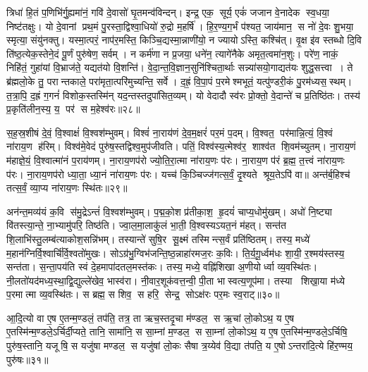 त्रिधा॑ हि॒तं प॒णिभि॑र्गु॒ह्यमा॑नं॒ गवि॑ दे॒वासो॑ घृ॒तमन्व॑विन्दन्। इन्द्र॒ एक॒ सूर्य॒ एकं॑ जजान वे॒नादेक स्व॒धया॒ निष्ट॑तक्षुः। यो दे॒वानां प्रथ॒मं पु॒रस्ता॒द्विश्वा॒धियो॑ रु॒द्रो म॒हर्\mbox{}षि॑। हि॒र॒ण्य॒ग॒र्भं प॑श्यत॒ जाय॑मान॒ स नो॑ दे॒वः शु॒भया॒ स्मृत्या॒ संयु॑नक्तु। यस्मा॒त्परं॒ नाप॑र॒मस्ति॒ किञ्चि॒द्यस्मा॒न्नाणी॑यो॒ न ज्यायोऽस्ति॒ कश्चि॑त्। वृ॒क्ष इ॑व स्तब्धो दि॒वि ति॑ष्ठ॒त्येक॒स्तेने॒दं पू॒र्णं पुरु॑षेण॒ सर्वम्। न कर्म॑णा न प्र॒जया॒ धने॑न॒ त्यागे॑नैके अमृत॒त्वमा॑न॒शुः। परे॑ण॒ नाकं॒ निहि॑तं॒ गुहा॑यां वि॒भ्राज॑ते॒ यद्यत॑यो वि॒शन्ति॑। वे॒दा॒न्त॒वि॒ज्ञान॒सुनि॑श्चिता॒र्थाः सन्न्या॑सयो॒गाद्यत॑यः शुद्ध॒सत्त्वा। ते ब्र॑ह्मलो॒के तु॒ परान्तकाले॒ परा॑मृता॒त्परि॑मुच्यन्ति॒ सर्वे। द॒ह्रं॒ वि॒पा॒पं प॒रमेश्मभूतं॒ यत्पु॑ण्डरी॒कं पु॒रम॑ध्यस॒स्थम्। त॒त्रा॒पि॒ द॒ह्रं ग॒गनं॑ विशोक॒स्तस्मि॑न् यद॒न्तस्तदुपा॑सित॒व्यम्। यो वेदादौ स्व॑रः प्रो॒क्तो॒ वे॒दान्ते॑ च प्र॒तिष्ठि॑तः। तस्य॑ प्र॒कृति॑लीन॒स्य॒ य॒ पर॑ स म॒हेश्व॑रः॥२८॥
\anuvakamend

स॒ह॒स्र॒शी\sr{}षं दे॒वं॒ वि॒श्वाक्षं॑ वि॒श्वश॑म्भुवम्। विश्वं॑ ना॒राय॑णं दे॒व॒म॒क्षरं॑ पर॒मं प॒दम्। 
वि॒श्वत॒ पर॑मान्नि॒त्यं॒ वि॒श्वं ना॑राय॒ण ह॑रिम्। विश्व॑मे॒वेदं पुरु॑ष॒स्तद्विश्व॒मुप॑जीवति। 
पतिं॒ विश्व॑स्य॒\aav{}\aav{}त्मेश्व॑र॒ शाश्व॑त शि॒वम॑च्युतम्। ना॒राय॒णं म॑हाज्ञे॒यं॒ वि॒श्वात्मा॑नं प॒राय॑णम्। ना॒राय॒णप॑रो ज्यो॒ति॒रा॒त्मा ना॑राय॒णः प॑रः। ना॒राय॒ण प॑रं ब्र॒ह्म॒ त॒त्त्वं ना॑राय॒णः प॑रः। ना॒राय॒णप॑रो ध्या॒ता॒ ध्या॒नं ना॑राय॒णः प॑रः। यच्च॑ कि॒ञ्चिज्ज॑गत्स॒र्वं॒ दृ॒श्यते श्रूय॒तेऽपि॑ वा॥ अन्त॑र्ब॒हिश्च॑ तत्स॒र्वं॒ व्या॒प्य ना॑राय॒णः स्थि॑तः॥२९॥

 अन॑न्त॒मव्य॑यं क॒वि स॑मु॒द्रेऽन्तं॑ वि॒श्वश॑म्भुवम्। प॒द्म॒को॒श प्र॑तीका॒श॒ हृ॒दयं॑ चाप्य॒धोमु॑खम्। अधो॑ नि॒ष्ट्या वि॑तस्त्या॒न्ते॒ ना॒भ्यामु॑परि॒ तिष्ठ॑ति। ज्वा॒ल॒मा॒लाकु॑लं भा॒ती॒ वि॒श्वस्यऽ\sav{}यत॒नं म॑हत्। सन्त॑त शि॒लाभि॑स्तु॒\-लम्ब॑त्याकोश॒सन्नि॑भम्। तस्यान्ते॑ सुषि॒र सू॒क्ष्मं तस्मिन्त्स॒र्वं प्रति॑ष्ठितम्। तस्य॒ मध्ये॑ म॒हान॑\-ग्निर्वि॒श्वार्चि॑र्वि॒श्वतो॑मुखः। सोऽग्र॑भु॒ग्विभ॑जन्ति॒ष्ठ॒न्नाहा॑रमज॒रः क॒विः। ति॒र्य॒गू॒र्ध्वम॑धः शा॒यी॒ र॒श्मय॑स्तस्य॒ सन्त॑ता। स॒न्ता॒पय॑ति स्वं दे॒हमापा॑द\-तल॒\-मस्त॑कः। तस्य॒ मध्ये॒ वह्नि॑शिखा अ॒णीयोर्ध्वा व्य॒वस्थि॑तः। नी॒लतो॑यद॑\-मध्य॒स्था॒द्वि॒द्युल्ले॑खेव॒ भास्व॑रा। नी॒वार॒शूक॑वत्त॒न्वी॒ पी॒ता भास्वत्य॒णूप॑मा। तस्या शिखा॒या म॑ध्ये प॒रमात्मा व्य॒वस्थि॑तः। स ब्रह्म॒ स शिव॒ स हरि॒ सेन्द्र॒ सोऽक्ष॑रः पर॒मः स्व॒राट्॥३०॥
\anuvakamend[ना॒रा॒य॒णः स्थि॑तो व्य॒वस्थि॑तश्च॒त्वारि॑ च]

आ॒दि॒त्यो वा ए॒ष ए॒तन्म॒ण्डलं॒ तप॑ति॒ तत्र॒ ता ऋच॒स्तदृ॒चा म॑ण्डल॒ स ऋ॒चां लो॒कोऽथ॒ य ए॒ष ए॒तस्मि॑न्म॒ण्डले॒ऽर्चिर्दी॒प्यते॒ तानि॒ सामा॑नि॒ स सा॒म्नां म॒ण्डल॒ स सा॒म्नां लो॒कोऽथ॒ य ए॒ष ए॒तस्मि॑न्म॒ण्डले॒ऽर्चिषि॒ पुरु॑ष॒स्तानि॒ यजूषि॒ स यजु॑षा मण्डल॒ स यजु॑षां लो॒कः सैषा त्र॒य्येव॑ वि॒द्या त॑पति॒ य ए॒षोऽन्तरा॑दि॒त्ये हि॑र॒ण्मय॒ पुरु॑षः॥३१॥
\anuvakamend



